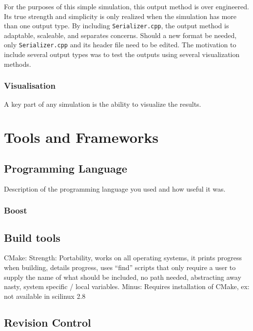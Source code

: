 \documentclass[a4paper,11pt]{article}
\begin{document}
For the purposes of this simple simulation, this output method is over engineered.  Its true strength and simplicity is only realized when the simulation has more than one output type.  By including \texttt{Serializer.cpp}, the output method is adaptable, scaleable, and separates concerns.  Should a new format be needed, only \texttt{Serializer.cpp} and its header file need to be edited.  The motivation to include several output types was to test the outputs using several visualization methods.

\subsubsection{Visualisation}

A key part of any simulation is the ability to visualize the results.  

\section{Tools and Frameworks}

\subsection{Programming Language}
Description of the programming language you used and how useful it was.

\subsubsection{Boost}


\subsection{Build tools}

CMake: 
Strength: Portability, works on all operating systems, it prints progress when building, details progress, uses ``find'' scripts that only require a user to supply the name of what should be included, no path needed, abstracting away nasty, system specific / local variables.
Minus:  Requires installation of CMake, ex: not available in scilinux 2.8

\subsection{Revision Control}
\end{document}
